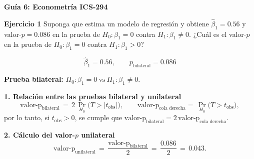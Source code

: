 \documentclass[11pt]{article}
\begin{document}
\begin{center}
{\large \textbf{Guía 6: Econometría ICS-294}}
\end{center}

\textbf{Ejercicio 1} Suponga que estima un modelo de regresión y obtiene 
$\hat{\beta}_1 = 0.56$ y valor-$p = 0.086$ en la prueba de 
$H_0: \beta_1 = 0$ contra $H_1: \beta_1 \neq 0$. 
¿Cuál es el valor-$p$ en la prueba de $H_0: \beta_1 = 0$ contra $H_1: \beta_1 > 0$?

{\color{blue}

\[
\hat{\beta}_1 = 0.56, \qquad p_{\text{bilateral}} = 0.086
\]

\textbf{Prueba bilateral: } $H_0:\beta_1=0 \ \text{vs}\ H_1:\beta_1\neq 0$.

\textbf{1. Relación entre las pruebas bilateral y unilateral}
\[
\text{valor-p}_{\text{bilateral}} \,=\, 2\,\Pr_{H_0}\!\big(T > |t_{\text{obs}}|\big), 
\qquad
\text{valor-p}_{\text{cola derecha}}=\, \Pr_{H_0}\!\big(T > t_{\text{obs}}\big),
\]
por lo tanto, si $t_{\text{obs}} > 0$, se cumple que 
$\text{valor-p}_{\text{bilateral}} = 2\,\text{valor-p}_{\text{cola derecha}}$.

\textbf{2. Cálculo del valor-$p$ unilateral}
\[
\text{valor-p}_{\text{unilateral}} \,=\, \frac{\text{valor-p}_{\text{bilateral}}}{2}
\,=\, \frac{0.086}{2} \,=\, 0.043.
\]}
\end{document}
